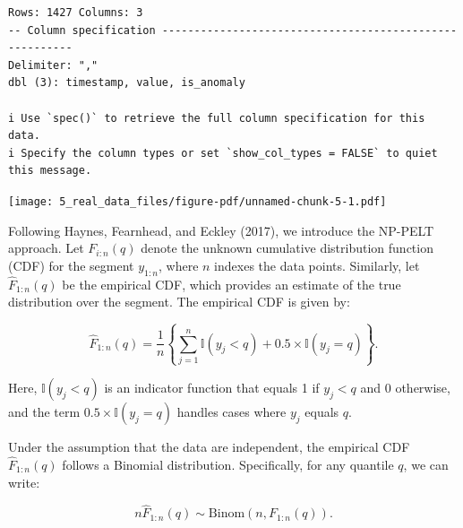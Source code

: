 \documentclass[
  letterpaper,
  DIV=11,
  numbers=noendperiod]{scrreprt}
\newenvironment{Shaded}{\begin{snugshade}}{\end{snugshade}}
\newcommand{\AttributeTok}[1]{\textcolor[rgb]{0.40,0.45,0.13}{#1}}
\newcommand{\DecValTok}[1]{\textcolor[rgb]{0.68,0.00,0.00}{#1}}
\newcommand{\FunctionTok}[1]{\textcolor[rgb]{0.28,0.35,0.67}{#1}}
\newcommand{\NormalTok}[1]{\textcolor[rgb]{0.00,0.23,0.31}{#1}}
\newcommand{\SpecialCharTok}[1]{\textcolor[rgb]{0.37,0.37,0.37}{#1}}
\newcommand{\StringTok}[1]{\textcolor[rgb]{0.13,0.47,0.30}{#1}}
\begin{document}
\begin{verbatim}
Rows: 1427 Columns: 3
-- Column specification --------------------------------------------------------
Delimiter: ","
dbl (3): timestamp, value, is_anomaly

i Use `spec()` to retrieve the full column specification for this data.
i Specify the column types or set `show_col_types = FALSE` to quiet this message.
\end{verbatim}

\begin{Shaded}
\end{Shaded}

\texttt{[image: 5\_real\_data\_files/figure-pdf/unnamed-chunk-5-1.pdf]}

Following Haynes, Fearnhead, and Eckley (2017), we introduce the NP-PELT
approach. Let \(F_{i:n}(q)\) denote the unknown cumulative distribution
function (CDF) for the segment \(y_{1:n}\), where \(n\) indexes the data
points. Similarly, let \(\hat{F}_{1:n}(q)\) be the empirical CDF, which
provides an estimate of the true distribution over the segment. The
empirical CDF is given by:

\[
\hat{F}_{1:n}(q) = \frac{1}{n} \left\{ \sum_{j=1}^{n} \mathbb{I}(y_j < q) + 0.5 \times \mathbb{I}(y_j = q) \right\}.
\]

Here, \(\mathbb{I}(y_j < q)\) is an indicator function that equals 1 if
\(y_j < q\) and 0 otherwise, and the term
\(0.5 \times \mathbb{I}(y_j = q)\) handles cases where \(y_j\) equals
\(q\).

Under the assumption that the data are independent, the empirical CDF
\(\hat{F}_{1:n}(q)\) follows a Binomial distribution. Specifically, for
any quantile \(q\), we can write:

\[
n\hat{F}_{1:n}(q) \sim \mathrm{Binom}(n, F_{1:n}(q)).
\]
\end{document}
